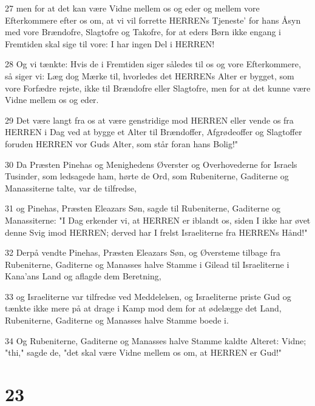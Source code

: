 \par 27 men for at det kan være Vidne mellem os og eder og mellem vore Efterkommere efter os om, at vi vil forrette HERRENs Tjeneste' for hans Åsyn med vore Brændofre, Slagtofre og Takofre, for at eders Børn ikke engang i Fremtiden skal sige til vore: I har ingen Del i HERREN!
\par 28 Og vi tænkte: Hvis de i Fremtiden siger således til os og vore Efterkommere, så siger vi: Læg dog Mærke til, hvorledes det HERRENs Alter er bygget, som vore Forfædre rejste, ikke til Brændofre eller Slagtofre, men for at det kunne være Vidne mellem os og eder.
\par 29 Det være langt fra os at være genstridige mod HERREN eller vende os fra HERREN i Dag ved at bygge et Alter til Brændoffer, Afgrødeoffer og Slagtoffer foruden HERREN vor Guds Alter, som står foran hans Bolig!"
\par 30 Da Præsten Pinehas og Menighedens Øverster og Overhovederne for Israels Tusinder, som ledsagede ham, hørte de Ord, som Rubeniterne, Gaditerne og Manassiterne talte, var de tilfredse,
\par 31 og Pinehas, Præsten Eleazars Søn, sagde til Rubeniterne, Gaditerne og Manassiterne: "I Dag erkender vi, at HERREN er iblandt os, siden I ikke har øvet denne Svig imod HERREN; derved har I frelst Israeliterne fra HERRENs Hånd!"
\par 32 Derpå vendte Pinehas, Præsten Eleazars Søn, og Øversteme tilbage fra Rubeniterne, Gaditerne og Manasses halve Stamme i Gilead til Israeliterne i Kana'ans Land og aflagde dem Beretning,
\par 33 og Israeliterne var tilfredse ved Meddelelsen, og Israeliterne priste Gud og tænkte ikke mere på at drage i Kamp mod dem for at ødelægge det Land, Rubeniterne, Gaditerne og Manasses halve Stamme boede i.
\par 34 Og Rubeniterne, Gaditerne og Manasses halve Stamme kaldte Alteret: Vidne; "thi," sagde de, "det skal være Vidne mellem os om, at HERREN er Gud!"

\chapter{23}

